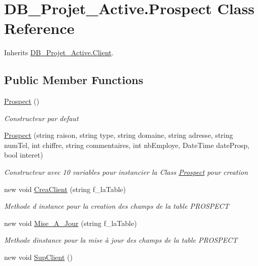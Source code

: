 \hypertarget{class_d_b___projet___active_1_1_prospect}{}\section{D\+B\+\_\+\+Projet\+\_\+\+Active.\+Prospect Class Reference}
\label{class_d_b___projet___active_1_1_prospect}


Inherits \mbox{\hyperlink{class_d_b___projet___active_1_1_client}{D\+B\+\_\+\+Projet\+\_\+\+Active.\+Client}}.

\subsection*{Public Member Functions}
\begin{DoxyCompactItemize}
\item 
\mbox{\hyperlink{class_d_b___projet___active_1_1_prospect_a25d0e27506b849aa57950ad509b6a10e}{Prospect}} ()
\begin{DoxyCompactList}\small\item\em Constructeur par defaut \end{DoxyCompactList}\item 
\mbox{\hyperlink{class_d_b___projet___active_1_1_prospect_a03e9423e46564727d70728c2127af3e7}{Prospect}} (string raison, string type, string domaine, string adresse, string num\+Tel, int chiffre, string commentaires, int nb\+Employe, Date\+Time date\+Prosp, bool interet)
\begin{DoxyCompactList}\small\item\em Constructeur avec 10 variables pour instancier la Class \mbox{\hyperlink{class_d_b___projet___active_1_1_prospect}{Prospect}} pour creation \end{DoxyCompactList}\item 
new void \mbox{\hyperlink{class_d_b___projet___active_1_1_prospect_aae2d7697d10fdaf537f54be852b6d692}{Crea\+Client}} (string f\+\_\+la\+Table)
\begin{DoxyCompactList}\small\item\em Methode d instance pour la creation des champs de la table P\+R\+O\+S\+P\+E\+CT \end{DoxyCompactList}\item 
new void \mbox{\hyperlink{class_d_b___projet___active_1_1_prospect_a1498a3cd63fe5363c14e0570eb02185c}{Mise\+\_\+\+A\+\_\+\+Jour}} (string f\+\_\+la\+Table)
\begin{DoxyCompactList}\small\item\em Methode dinstance pour la mise à jour des champs de la table P\+R\+O\+S\+P\+E\+CT \end{DoxyCompactList}\item 
new void \mbox{\hyperlink{class_d_b___projet___active_1_1_prospect_a47393548b1c8a4bac6471702b3d50faf}{Sup\+Client}} ()
\end{DoxyCompactItemize}
